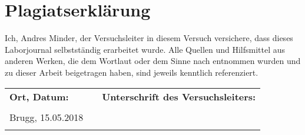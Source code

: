 \chapter{Plagiatserklärung}
\thispagestyle{fancy}
Ich, Andres Minder, der Versuchsleiter in diesem Versuch versichere, dass dieses Laborjournal selbstständig erarbeitet wurde. Alle Quellen und Hilfsmittel aus anderen Werken, die dem Wortlaut oder dem Sinne nach entnommen wurden und zu dieser Arbeit beigetragen haben, sind jeweils kenntlich referenziert.\\
\vfill
\begin{center}
\begin{tabular}{p{5cm}p{1cm}l}
\Large\textbf{Ort, Datum:} & & \Large\textbf{Unterschrift des Versuchsleiters:} \\
\vspace{1cm} & \vspace{1cm} & \vspace{1cm} \\
\centering\Large{Brugg, 15.05.2018} & & \\
\hrulefill & & \hrulefill 
\end{tabular}
\end{center}